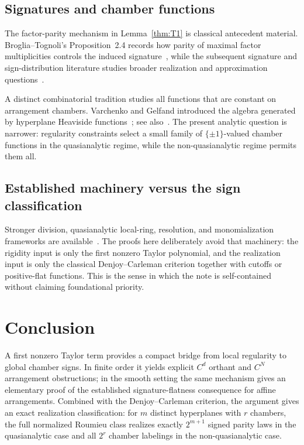 \documentclass[11pt]{article}
\theoremstyle{definition}
\theoremstyle{remark}
\begin{document}
\subsection{Signatures and chamber functions}
The factor-parity mechanism in Lemma~\ref{thm:T1} is classical antecedent material. Broglia--Tognoli's Proposition~2.4 records how parity of maximal factor multiplicities controls the induced signature~\cite[Proposition~2.4]{BrogliaTognoli1989}, while the subsequent signature and sign-distribution literature studies broader realization and approximation questions~\cite{Fortuna1991,AcquistapaceBroglia1992,AcquistapaceBroglia1993Correction,AcquistapaceBrogliaFortuna1994,AcquistapaceBroglia1994}.

A distinct combinatorial tradition studies all functions that are constant on arrangement chambers. Varchenko and Gelfand introduced the algebra generated by hyperplane Heaviside functions~\cite{VarchenkoGelfand1987}; see also~\cite{Moseley2017,BjornerEtAl1999}. The present analytic question is narrower: regularity constraints select a small family of $\{\pm1\}$-valued chamber functions in the quasianalytic regime, while the non-quasianalytic regime permits them all.

\subsection{Established machinery versus the sign classification}
Stronger division, quasianalytic local-ring, resolution, and monomialization frameworks are available~\cite{Thilliez2008,BierstoneMilman2004,BelottoBierstoneChow2018,BelottoBierstone2023}. The proofs here deliberately avoid that machinery: the rigidity input is only the first nonzero Taylor polynomial, and the realization input is only the classical Denjoy--Carleman criterion together with cutoffs or positive-flat functions. This is the sense in which the note is self-contained without claiming foundational priority.

\section{Conclusion}

A first nonzero Taylor term provides a compact bridge from local regularity to global chamber signs. In finite order it yields explicit $C^d$ orthant and $C^N$ arrangement obstructions; in the smooth setting the same mechanism gives an elementary proof of the established signature-flatness consequence for affine arrangements. Combined with the Denjoy--Carleman criterion, the argument gives an exact realization classification: for $m$ distinct hyperplanes with $r$ chambers, the full normalized Roumieu class realizes exactly $2^{m+1}$ signed parity laws in the quasianalytic case and all $2^r$ chamber labelings in the non-quasianalytic case.
\end{document}
